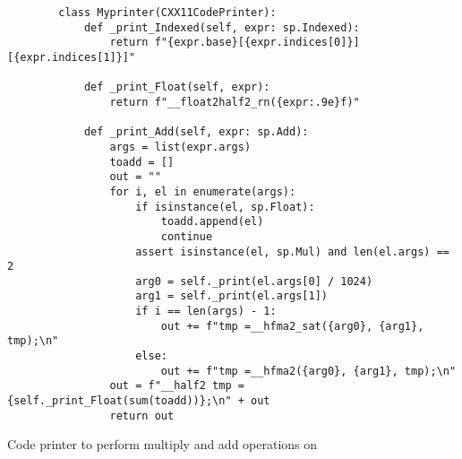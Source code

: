 

\begin{listing}[H]
    \begin{verbatim}
        class Myprinter(CXX11CodePrinter):
            def _print_Indexed(self, expr: sp.Indexed):
                return f"{expr.base}[{expr.indices[0]}][{expr.indices[1]}]"

            def _print_Float(self, expr):
                return f"__float2half2_rn({expr:.9e}f)"

            def _print_Add(self, expr: sp.Add):
                args = list(expr.args)
                toadd = []
                out = ""
                for i, el in enumerate(args):
                    if isinstance(el, sp.Float):
                        toadd.append(el)
                        continue
                    assert isinstance(el, sp.Mul) and len(el.args) == 2
                    arg0 = self._print(el.args[0] / 1024)
                    arg1 = self._print(el.args[1])
                    if i == len(args) - 1:
                        out += f"tmp =__hfma2_sat({arg0}, {arg1}, tmp);\n"
                    else:
                        out += f"tmp =__hfma2({arg0}, {arg1}, tmp);\n"
                out = f"__half2 tmp = {self._print_Float(sum(toadd))};\n" + out
                return out
        \end{verbatim}
    \caption{Code printer to perform multiply and add operations on \halftwo}
\end{listing}

